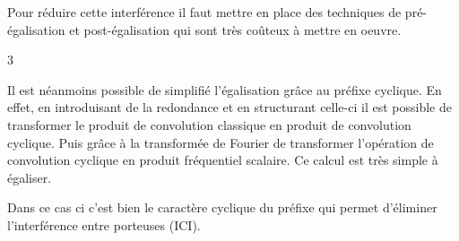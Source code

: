 Pour réduire cette interférence il faut mettre en place des techniques de
pré-égalisation et post-égalisation qui sont très coûteux à mettre en oeuvre.

3

Il est néanmoins possible de simplifié l'égalisation grâce au préfixe cyclique.
En effet, en introduisant de la redondance et en structurant celle-ci il est
possible de transformer le produit de convolution classique en produit de
convolution cyclique. Puis grâce à la transformée de Fourier de transformer
l'opération de convolution cyclique en produit fréquentiel scalaire. Ce calcul
est très simple à égaliser.

Dans ce cas ci c'est bien le caractère cyclique du préfixe qui permet d'éliminer
l'interférence entre porteuses (ICI).




